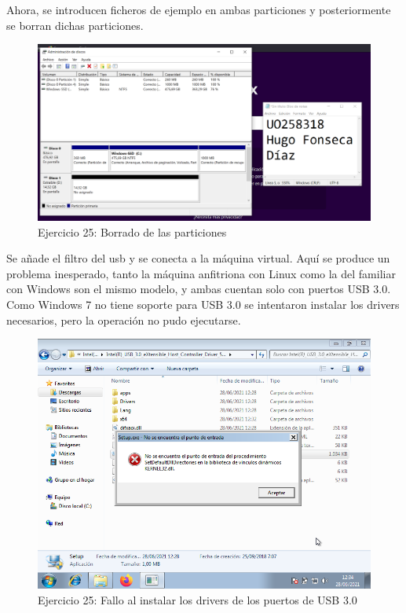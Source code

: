 \documentclass[11pt]{article}
\begin{document}
Ahora, se introducen ficheros de ejemplo en ambas particiones y posteriormente se borran dichas particiones.

\begin{figure}[H]
    \caption{Ejercicio 25: Borrado de las particiones}
  \centering
    \includegraphics[scale=0.4]{p05/e25-2.PNG}
\end{figure}

Se añade el filtro del usb y se conecta a la máquina virtual. Aquí se produce un problema inesperado, tanto la máquina anfitriona con Linux como la del familiar con Windows son el mismo modelo, y ambas cuentan solo con puertos USB 3.0. Como Windows 7 no tiene soporte para USB 3.0 se intentaron instalar los drivers necesarios, pero la operación no pudo ejecutarse.

\begin{figure}[H]
    \caption{Ejercicio 25: Fallo al instalar los drivers de los puertos de USB 3.0}
  \centering
    \includegraphics[scale=0.8]{p05/e25-3.png}
\end{figure}
\end{document}

